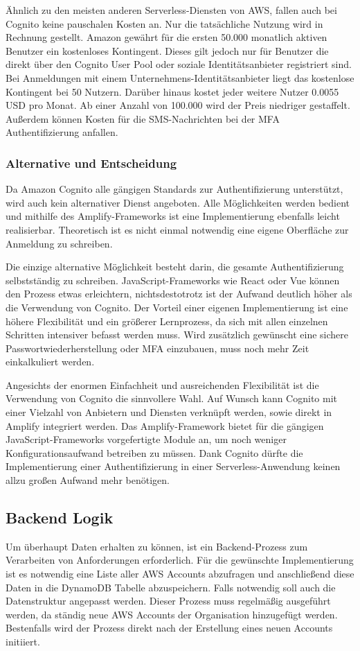 {Ähnlich zu den meisten anderen Serverless-Diensten von AWS, fallen auch bei Cognito keine pauschalen Kosten an.
Nur die tatsächliche Nutzung wird in Rechnung gestellt.
Amazon gewährt für die ersten 50.000 monatlich aktiven Benutzer ein kostenloses Kontingent.
Dieses gilt jedoch nur für Benutzer die direkt über den Cognito User Pool oder soziale Identitätsanbieter registriert sind.
Bei Anmeldungen mit einem Unternehmens-Identitätsanbieter liegt das kostenlose Kontingent bei 50 Nutzern.
Darüber hinaus kostet jeder weitere Nutzer 0.0055 USD pro Monat.
Ab einer Anzahl von 100.000 wird der Preis niedriger gestaffelt.
Außerdem können Kosten für die SMS-Nachrichten bei der MFA Authentifizierung anfallen.\cite{CognitoPreise}


\subsubsection{Alternative und Entscheidung}
\label{CognitoEntscheidung}
Da Amazon Cognito alle gängigen Standards zur Authentifizierung unterstützt, wird auch kein alternativer Dienst angeboten.
Alle Möglichkeiten werden bedient und mithilfe des Amplify-Frameworks ist eine Implementierung ebenfalls leicht realisierbar.
Theoretisch ist es nicht einmal notwendig eine eigene Oberfläche zur Anmeldung zu schreiben.

Die einzige alternative Möglichkeit besteht darin, die gesamte Authentifizierung selbstständig zu schreiben.
JavaScript-Frameworks wie React oder Vue können den Prozess etwas erleichtern, nichtsdestotrotz ist der Aufwand deutlich höher als die Verwendung von Cognito.
Der Vorteil einer eigenen Implementierung ist eine höhere Flexibilität und ein größerer Lernprozess, da sich mit allen einzelnen Schritten intensiver befasst werden muss.
Wird zusätzlich gewünscht eine sichere Passwortwiederherstellung oder MFA einzubauen, muss noch mehr Zeit einkalkuliert werden.

Angesichts der enormen Einfachheit und ausreichenden Flexibilität ist die Verwendung von Cognito die sinnvollere Wahl.
Auf Wunsch kann Cognito mit einer Vielzahl von Anbietern und Diensten verknüpft werden, sowie direkt in Amplify integriert werden.
Das Amplify-Framework bietet für die gängigen JavaScript-Frameworks vorgefertigte Module an, um noch weniger Konfigurationsaufwand betreiben zu müssen.
Dank Cognito dürfte die Implementierung einer Authentifizierung in einer Serverless-Anwendung keinen allzu großen Aufwand mehr benötigen.


\subsection{Backend Logik}
Um überhaupt Daten erhalten zu können, ist ein Backend-Prozess zum Verarbeiten von Anforderungen erforderlich.
Für die gewünschte Implementierung ist es notwendig eine Liste aller AWS Accounts abzufragen und anschließend diese Daten in die DynamoDB Tabelle abzuspeichern.
Falls notwendig soll auch die Datenstruktur angepasst werden.
Dieser Prozess muss regelmäßig ausgeführt werden, da ständig neue AWS Accounts der Organisation hinzugefügt werden.
Bestenfalls wird der Prozess direkt nach der Erstellung eines neuen Accounts initiiert.

}
